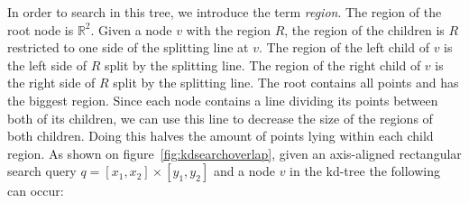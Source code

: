 %
%
%
%
%
%
In order to search in this tree, we introduce the term \emph{region}. The region of the root node is $\mathbb{R}^2$. Given a node $v$ with the region $R$, the region of the children is $R$ restricted to one side of the splitting line at $v$. The region of the left child of $v$ is the left side of $R$ split by the splitting line. The region of the right child of $v$ is the right side of $R$ split by the splitting line. The root contains all points and has the biggest region. Since each node contains a line dividing its points between both of its children, we can use this line to decrease the size of the regions of both children. Doing this halves the amount of points lying within each child region. As shown on figure~\ref{fig:kdsearchoverlap}, given an axis-aligned rectangular search query $q = [x_1, x_2] \times [y_1, y_2]$ and a node $v$ in the kd-tree the following can occur:

